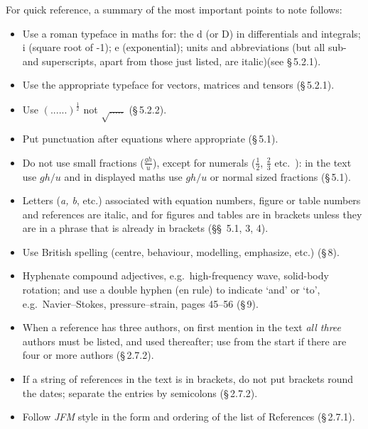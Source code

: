For quick reference, a summary of the most important points to note follows:
\begin{itemize}
\item Use a roman typeface in maths for:  the d (or D) in
differentials and integrals; i (square root of -1); e (exponential);
units and abbreviations (but all sub- and superscripts, apart from
those just listed, are italic)(see \S\,5.2.1).
          
\item  Use the appropriate typeface for vectors, matrices and tensors 
(\S\,5.2.1).

\item  Use $(......)^{\frac{1}{2}}$   not  $\sqrt{.....}$ (\S\,5.2.2).

\item  Put punctuation after equations where appropriate (\S\,5.1).

\item  Do not use small fractions  ($\frac{gh}{u}$),  except for
numerals ($\frac{1}{2}$,  $\frac{2}{3}$ etc.\ ): in the text use $gh/u$
and in displayed maths use $gh/u$ or normal sized fractions (\S\,5.1).

\item  Letters ({\it a, b}, etc.) associated with  equation numbers,
figure or table  numbers and references are italic, and for figures
and tables are in brackets unless they are in a phrase that is already
in brackets (\S\S\, 5.1,  3, 4).

\item Use British spelling (centre, behaviour, modelling, emphasize,
etc.)  (\S\,8).

\item  Hyphenate compound adjectives, e.g.\ high-frequency wave,
solid-body rotation; and use a double hyphen (en rule) to indicate
`and' or `to', e.g.\ Navier--Stokes, pressure--strain, pages 45--56 (\S\,9).

\item  When a reference has three authors, on first mention in the
text {\em all three\/} authors must be listed, and \etal used
thereafter; use \etal from the start if there are four or more authors (\S\,2.7.2).

\item  If a string of references in the text is in brackets, do not put
brackets round the dates; separate the entries by semicolons (\S\,2.7.2).

\item  Follow {\it JFM\/} style in the form and ordering of the list of 
References (\S\,2.7.1).
\end{itemize}

